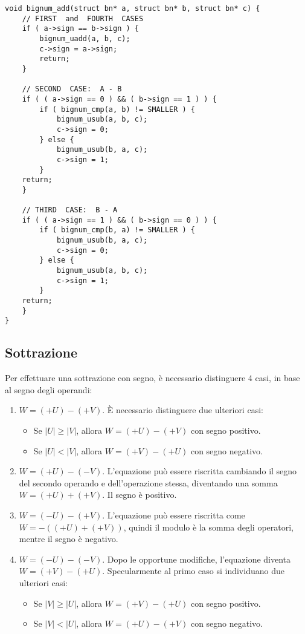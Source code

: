 \begin{lstlisting}[basicstyle=\ttfamily\small, backgroundcolor=\color{bgCode}]
void bignum_add(struct bn* a, struct bn* b, struct bn* c) {
    // FIRST  and  FOURTH  CASES
    if ( a->sign == b->sign ) {
        bignum_uadd(a, b, c);
        c->sign = a->sign;
        return;
    }
    
    // SECOND  CASE:  A - B
    if ( ( a->sign == 0 ) && ( b->sign == 1 ) ) {
        if ( bignum_cmp(a, b) != SMALLER ) {
            bignum_usub(a, b, c);
            c->sign = 0;
        } else {
            bignum_usub(b, a, c);
            c->sign = 1;
        }
    return;
    }
    
    // THIRD  CASE:  B - A
    if ( ( a->sign == 1 ) && ( b->sign == 0 ) ) {
        if ( bignum_cmp(b, a) != SMALLER ) {
            bignum_usub(b, a, c);
            c->sign = 0;
        } else {
            bignum_usub(a, b, c);
            c->sign = 1;
        }
    return;
    }
}
\end{lstlisting}

%
\subsection{Sottrazione}
%

Per effettuare una sottrazione con segno, è necessario distinguere 4 casi, in base al segno degli operandi:
\begin{enumerate}
	\item $W = (+U) - (+V)$. È necessario distinguere due ulteriori casi:
	\begin{itemize}
		\item Se $\lvert U \rvert \geq \lvert V \rvert$, allora $W = (+U) - (+V)$ con segno positivo.
		\item Se $\lvert U \rvert < \lvert V \rvert$, allora $W = (+V) - (+U)$ con segno negativo.
	\end{itemize}
	\item $W = (+U) - (-V)$. L'equazione può essere riscritta cambiando il segno del secondo operando e dell'operazione stessa, diventando una somma $W = (+U) + (+V)$. Il segno è positivo.
	\item $W = (-U) - (+V)$. L'equazione può essere riscritta come $W = -\left( (+U) + (+V) \right)$, quindi il modulo è la somma degli operatori, mentre il segno è negativo.
	\item $W = (-U) - (-V)$. Dopo le opportune modifiche, l'equazione diventa $W = (+V) - (+U)$. Specularmente al primo caso si individuano due ulteriori casi:
	\begin{itemize}
		\item Se $\lvert V \rvert \geq \lvert U \rvert$, allora $W = (+V) - (+U)$ con segno positivo.
		\item Se $\lvert V \rvert < \lvert U \rvert$, allora $W = (+U) - (+V)$ con segno negativo.
	\end{itemize}
\end{enumerate}

